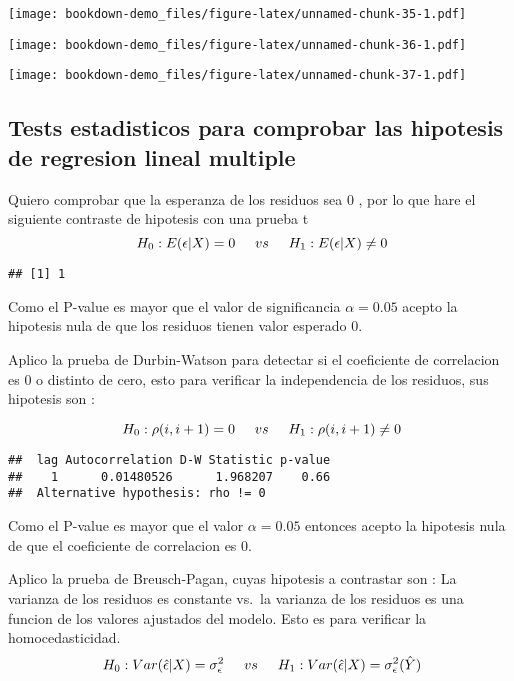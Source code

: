 \documentclass[]{book}
\begin{document}
\texttt{[image: bookdown-demo\_files/figure-latex/unnamed-chunk-35-1.pdf]}

\texttt{[image: bookdown-demo\_files/figure-latex/unnamed-chunk-36-1.pdf]}

\texttt{[image: bookdown-demo\_files/figure-latex/unnamed-chunk-37-1.pdf]}

\subsection{Tests estadisticos para comprobar las hipotesis de regresion
lineal
multiple}\label{tests-estadisticos-para-comprobar-las-hipotesis-de-regresion-lineal-multiple}

Quiero comprobar que la esperanza de los residuos sea 0 , por lo que
hare el siguiente contraste de hipotesis con una prueba t
\[ \ H_{0} : E(\epsilon|X) = 0 \hspace{0.5cm} vs \hspace{0.5cm} H_{1}: E(\epsilon|X) \neq 0 \]

\begin{verbatim}
## [1] 1
\end{verbatim}

Como el P-value es mayor que el valor de significancia \(\alpha = 0.05\)
acepto la hipotesis nula de que los residuos tienen valor esperado 0.

Aplico la prueba de Durbin-Watson para detectar si el coeficiente de
correlacion es 0 o distinto de cero, esto para verificar la
independencia de los residuos, sus hipotesis son :

\[ \ H_{0} : \rho(i,i+1) = 0 \hspace{0.5cm} vs \hspace{0.5cm} H_{1}: \rho(i,i+1) \neq 0 \]

\begin{verbatim}
##  lag Autocorrelation D-W Statistic p-value
##    1      0.01480526      1.968207    0.66
##  Alternative hypothesis: rho != 0
\end{verbatim}

Como el P-value es mayor que el valor \(\alpha = 0.05\) entonces acepto
la hipotesis nula de que el coeficiente de correlacion es 0.

Aplico la prueba de Breusch-Pagan, cuyas hipotesis a contrastar son : La
varianza de los residuos es constante vs.~la varianza de los residuos es
una funcion de los valores ajustados del modelo. Esto es para verificar
la homocedasticidad.
\[ \ H_{0}: Var(\hat{\epsilon} |X) = \sigma_{\epsilon}^{2} \hspace{0.5cm} vs \hspace{0.5cm} H_{1}: Var(\hat{\epsilon} |X) =  \sigma_{\epsilon}^{2}( \hat{Y}) \]
\end{document}
